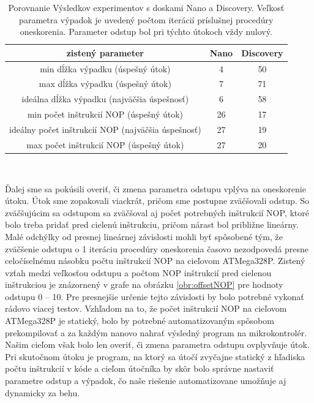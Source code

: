 \begin{table}
    \caption[Porovnanie Výsledkov experimentov]{Porovnanie Výsledkov experimentov s doskami Nano a Discovery. Veľkosť parametra výpadok je uvedený počtom iterácií príslušnej procedúry oneskorenia. Parameter odstup bol pri týchto útokoch vždy nulový.}
    \label{tab:experiments}
    \begin{center}
    \begin{tabular}{|c|c|c|}
        \hline
        zistený parameter & Nano & Discovery \\
        \hline
        min dĺžka výpadku (úspešný útok) & 4 & 50 \\
        \hline
        max dĺžka výpadku (úspešný útok) & 7 & 71 \\
        \hline
        ideálna dĺžka výpadku (najväčšia úspešnosť) & 6 & 58 \\
        \hline
        min počet inštrukcií NOP (úspešný útok) & 26 & 17 \\
        \hline
        ideálny počet inštrukcií NOP (najväčšia úspešnosť) & 27 & 19 \\
        \hline
        max počet inštrukcií NOP (úspešný útok) & 27 & 20 \\
        \hline
    \end{tabular}\\[6pt]
    \end{center}
\end{table}

Ďalej sme sa pokúsili overiť, či zmena parametra odstupu vplýva na oneskorenie útoku. Útok sme zopakovali viackrát, pričom sme postupne zväčšovali odstup. So zväčšujúcim sa odstupom sa zväčšoval aj počet potrebných inštrukcií NOP, ktoré bolo treba pridať pred cielenú inštrukciu, pričom nárast bol približne lineárny. Malé odchýlky od presnej lineárnej závislosti mohli byť spôsobené tým, že zväčšenie odstupu o 1 iteráciu procedúry oneskorenia časovo nezodpovedá presne celočíselnému násobku počtu inštrukcií NOP na cieľovom ATMega328P. Zistený vzťah medzi veľkosťou odstupu a počtom NOP inštrukcií pred cielenou inštrukciou je znázornený v grafe na obrázku \ref{obr:offsetNOP} pre hodnoty odstupu 0 -- 10. Pre presnejšie určenie tejto závislosti by bolo potrebné vykonať rádovo viacej testov. Vzhľadom na to, že počet inštrukcií NOP na cieľovom ATMega328P je statický, bolo by potrebné automatizovaným spôsobom prekompilovať a za každým nanovo nahrať výsledný program na mikrokontrolér. Našim cieľom však bolo len overiť, či zmena parametra odstupu ovplyvňuje útok. Pri skutočnom útoku je program, na ktorý sa útočí zvyčajne statický z hľadiska počtu inštrukcií v kóde a cieľom útočníka by skôr bolo správne nastaviť parametre odstup a výpadok, čo naše riešenie automatizovane umožňuje aj dynamicky za behu.

